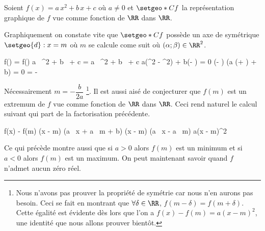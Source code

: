 Soient $f(x) = a \, x^2 + b \, x + c$ où $a \neq 0$ et $\setgeo*{C}{f}$ la représentation graphique de $f$ vue comme fonction de $\RR$ dans $\RR$.

\medskip

Graphiquement on constate vite que $\setgeo*{C}{f}$ possède un axe de symétrique $\setgeo{d}: x = m$ où $m$ se calcule come suit où $(\alpha ; \beta) \in \RR^2$.

\medskip

\begin{explain}[style = sar, ope = \iff] 
	f(\alpha) = f(\beta)
		\explnext{}
	a \, \alpha^2 + b \, \alpha + c = a \, \beta^2 + b \, \beta + c
		\explnext{}
	a(\alpha^2 - \beta^2) + b(\alpha - \beta) = 0
		\explnext{}
	(\alpha - \beta) (a (\alpha + \beta) + b) = 0
									\quad\quad {}
		\explnext{}
	 = - 
\end{explain}

\medskip

Nécessairement $m = - \dfrac{b}{2a}$
\footnote{
	Nous n'avons pas prouver la propriété de symétrie car nous n'en aurons pas besoin.
	Ceci se fait en montrant que $\forall \delta \in \RR$, $f(m - \delta) = f(m + \delta)$.
	Cette égalité est évidente dès lors que l'on a $f(x) - f(m) = a(x - m)^2$, une identité que nous allons prouver bientôt.
}.
Il est aussi aisé de conjecturer que $f(m)$ est un extremum de $f$ vue comme fonction de $\RR$ dans $\RR$. Ceci rend naturel le calcul suivant qui part de la factorisation  précédente.

\medskip

\begin{explain}[style = sar] 
	f(x) - f(m)
		\explnext{}
	(x - m) (a \, x + a \, m + b)
	(x - m) (a \, x - a \, m)
		\explnext{}
	a(x - m)^2
\end{explain}

\medskip

Ce qui précède montre aussi que 
si $a > 0$ alors $f(m)$ est un minimum et
si $a < 0$ alors $f(m)$ est un maximum. On peut maintenant savoir quand $f$ n'admet aucun zéro réel.

